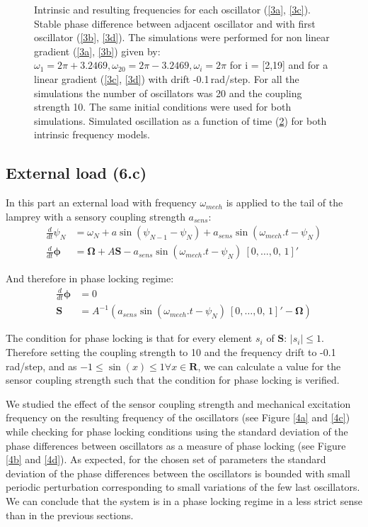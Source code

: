 \documentclass[a4paper]{scrartcl}
\begin{document}
\begin{figure}[!b]
\begin{subfigure}[b]{\textwidth}
		\caption{}\label{3e}
	\end{subfigure}
	\caption{Intrinsic and resulting frequencies for each oscillator (\ref{3a}, \ref{3c}). Stable phase difference between adjacent oscillator and with first oscillator (\ref{3b}, \ref{3d}). The simulations were performed for non linear gradient (\ref{3a}, \ref{3b}) given by: $\omega_{1} = 2\pi + 3.2469 ,\omega_{20} = 2\pi - 3.2469 , \omega_{i} = 2\pi$ for i = [2,19] and for a linear gradient (\ref{3c}, \ref{3d}) with drift -0.1\,rad/step. For all the simulations the number of oscillators was 20 and the coupling strength 10. The same initial conditions were used for both simulations. Simulated oscillation as a function of time (\ref{3e}) for both intrinsic frequency models.}
\end{figure}


\subsection{External load (6.c)}
In this part an external load with frequency $\omega_{mech}$ is applied to the tail of the lamprey with a sensory coupling strength $a_{sens}$:
\begin{align*}
\frac{d}{dt}\psi_N &= \omega_N + a \sin(\psi_{N-1}-\psi_N) + a_{sens} \sin(\omega_{mech}.t-\psi_N) \\
\frac{d}{dt}\mathbf{\phi} &= \mathbf{\Omega} + A \mathbf{S} - a_{sens} \sin(\omega_{mech}.t-\psi_N)\ [0, \ldots, 0,\, 1]'
\end{align*}

\vspace{0.5cm}

And therefore in phase locking regime:
\begin{align*}
\frac{d}{dt}\mathbf{\phi} &= 0\\
\mathbf{S} &= A^{-1}(a_{sens}\sin(\omega_{mech}.t-\psi_N)\ [0, \ldots, 0,\, 1]'-\mathbf{\Omega})
\end{align*}

\vspace{0.5cm}

The condition for phase locking is that for every element $s_i$ of $\mathbf{S}$: $|s_i|\leq1$.
Therefore setting the coupling strength to 10 and the frequency drift to -0.1\,rad/step, and as $-1\leq\sin(x)\leq1 \forall x \in \mathbf{R}$, we can calculate a value for the sensor coupling strength such that the condition for phase locking is verified.

We studied the effect of the sensor coupling strength and mechanical excitation frequency on the resulting frequency of the oscillators (see Figure \ref{4a} and \ref{4c}) while checking for phase locking conditions using the standard deviation of the phase differences between oscillators as a measure of phase locking (see Figure \ref{4b} and \ref{4d}). As expected, for the chosen set of parameters the standard deviation of the phase differences between the oscillators is bounded with small periodic perturbation corresponding to small variations of the few last oscillators. We can conclude that the system is in a phase locking regime in a less strict sense than in the previous sections.
\end{document}
